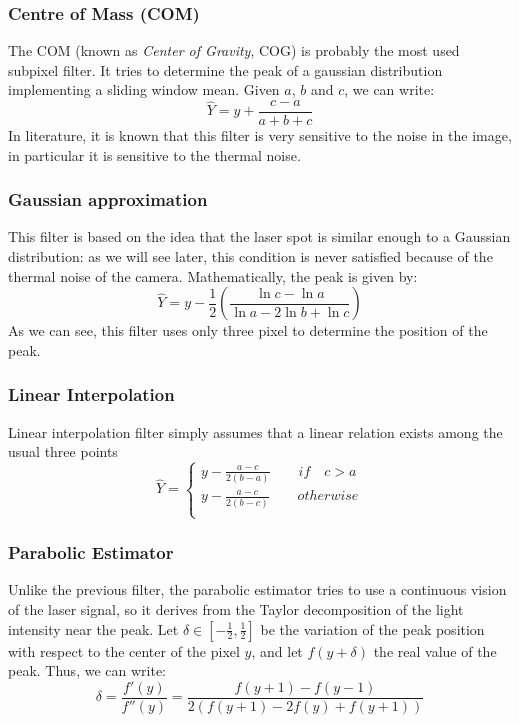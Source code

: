 \subsubsection{Centre of Mass (\acs{COM})}
The \acs{COM} (known as \textit{Center of Gravity}, \acs{COG}) is probably the most used subpixel filter. It tries to determine the peak of a gaussian distribution implementing a sliding window mean. Given $a$, $b$ and $c$, we can write:
  \begin{equation}
    \hat{Y} = y +\frac{c - a}{a + b + c}
    \label{eq:sp-com}
  \end{equation}
In literature, it is known that this filter is very sensitive to the noise in the image, in particular it is sensitive to the thermal noise.

\subsubsection{Gaussian approximation}
This filter is based on the idea that the laser spot is similar enough to a Gaussian distribution: as we will see later, this condition is never satisfied because of the thermal noise of the camera. Mathematically, the peak is given by:
  \begin{equation}
    \hat{Y} = y - \frac{1}{2}\left( \frac{\ln{c} - \ln{a}}{\ln{a} - 2\ln{b} + \ln{c}} \right)
    \label{eq:sp-gauss}
  \end{equation}
As we can see, this filter uses only three pixel to determine the position of the peak.

\subsubsection{Linear Interpolation}
Linear interpolation filter simply assumes that a linear relation exists among the usual three points
  \begin{equation}
    \hat{Y} = \begin{cases}
      y - \frac{a - c}{2(b - a)} \qquad if \quad c > a \\
      y - \frac{a - c}{2(b - c)} \qquad otherwise \\
    \end{cases}
    \label{eq:sp-linear}
  \end{equation}

\subsubsection{Parabolic Estimator}
Unlike the previous filter, the parabolic estimator tries to use a continuous vision of the laser signal, so it derives from the Taylor decomposition of the light intensity near the peak.
Let $\delta \in \left[ -\frac{1}{2}, \frac{1}{2} \right]$ be the variation of the peak position with respect to the center of the pixel $y$, and let $f(y + \delta)$ the real value of the peak. Thus, we can write:
  \begin{equation}
  \delta = \frac{f'(y)}{f''(y)} = \frac{f(y+1) - f(y-1)}{2\left( f(y+1) - 2f(y) + f(y+1)\right)}
    \label{eq:sp-parabolic}
  \end{equation}

